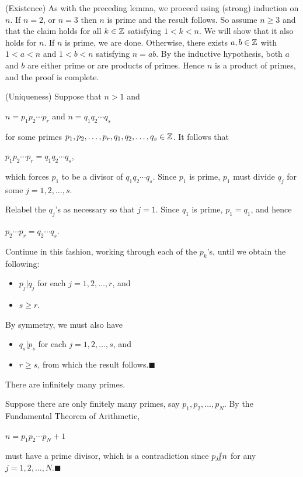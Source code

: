 \documentclass[11pt,fleqn,dvipsnames,usenames]{article}
\newcommand{\p}{\noindent}
\newcommand{\ENDPRF}{\hfill $\blacksquare$}
\begin{document}
\prf
\vsmsp

\p (Existence) As with the preceding lemma, we proceed using (strong) induction on $n$.  If $n=2$, or $n=3$ then $n$ is prime and the result follows.  So assume $n\geq 3$ and that the claim holds for all $k\in\mathbb{Z}$ satisfying $1 < k < n$.  We will show that it also holds for $n$.  If $n$ is prime, we are done.  Otherwise, there exists $a,b\in\mathbb{Z}$ with $1 < a < n$ and $1 < b < n$ satisfying $n = ab$.  By the inductive hypothesis, both $a$ and $b$ are either prime or are products of primes.  Hence $n$ is a product of primes, and the proof is complete.
\vsp

\p (Uniqueness) Suppose that $n > 1$ and 
\begin{center}
$n = p_{1}p_{2}\cdots p_{r}$ and $n = q_{1}q_{2}\cdots q_{s}$
\end{center}
for some primes $p_{1},p_{2},\ldots,p_{r},q_{1},q_{2},\ldots, q_{s}\in \mathbb{Z}$.  It follows that
\begin{center}
$p_{1}p_{2}\cdots p_{r} = q_{1}q_{2}\cdots q_{s}$,
\end{center}
which forces $p_{1}$ to be a divisor of $q_{1}q_{2}\cdots q_{s}$.  Since $p_{1}$ is prime, $p_{1}$ must divide $q_{j}$ for some $j=1,2,\ldots, s$.
\vsp

\p Relabel the $q_{j}$'s as necessary so that $j=1$.  Since $q_{1}$ is prime, $p_{1} = q_{1}$, and hence
\begin{center}
$p_{2}\cdots p_{r} = q_{2}\cdots q_{s}$.
\end{center}
Continue in this fashion, working through each of the $p_{k}$'s, until we obtain the following:
\begin{itemize}
\item $p_{j}|q_{j}$ for each $j=1,2,\ldots, r$, and
\item $s\geq r$.
\end{itemize}
By symmetry, we must also have
\begin{itemize}
\item $q_{s}|p_{s}$ for each $j=1,2,\ldots, s$, and 
\item $r\geq s$, from which the result follows.\ENDPRF
\end{itemize}
\vsp

\crlry There are infinitely many primes.
\vsp

\prf Suppose there are only finitely many primes, say $p_{1}, p_{2},\ldots, p_{N}$.  By the Fundamental Theorem of Arithmetic,
\begin{center}
$n = p_{1}p_{2}\cdots p_{N} + 1$
\end{center}
must have a prime divisor, which is a contradiction since $p_{j}|\kern-0.9ex{/} n$ for any $j=1,2,\ldots, N$.\ENDPRF
\vsp
\end{document}
